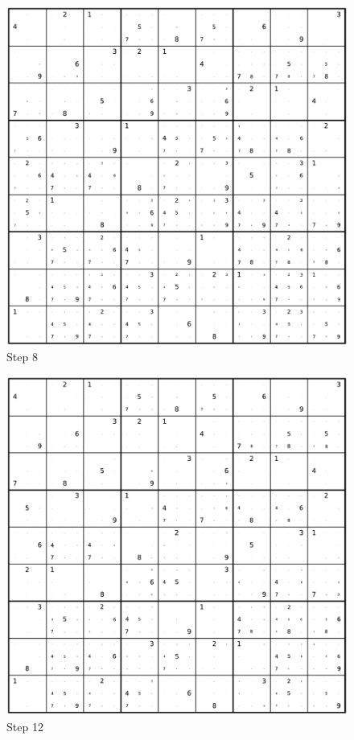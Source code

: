 \begin{figure}
	\caption*{Step 8}
	\centering
	\includegraphics[width=1.0\textwidth]{figures/full/000-08.pdf}
\end{figure}

\begin{figure}
	\caption*{Step 12}
	\centering
	\includegraphics[width=1.0\textwidth]{figures/full/000-12.pdf}
\end{figure}

